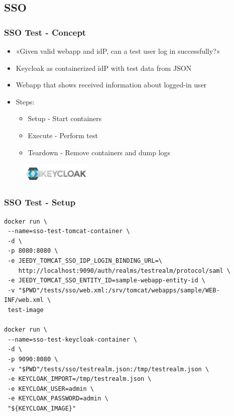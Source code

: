 \documentclass[14pt,aspectratio=169]{beamer}
\begin{document}
\subsection{SSO}

\begin{frame}
  \frametitle{SSO Test - Concept} 
  \begin{itemize}
    \item «Given valid webapp and idP, can a test user log in successfully?»
    \item Keycloak as containerized idP with test data from JSON
    \item Webapp that shows received information about logged-in user
    \item Steps:
    \begin{itemize}
      \item Setup - Start containers
      \item Execute - Perform test
      \item Teardown - Remove containers and dump logs
    \end{itemize}
  \end{itemize}
  \begin{figure}
    \includegraphics[width=0.3\textwidth]{images/keycloak_logo.png}
  \end{figure}
\end{frame}

\begin{frame}[fragile]
  \frametitle{SSO Test - Setup}

  \begin{verbatim}
docker run \
 --name=sso-test-tomcat-container \
 -d \
 -p 8080:8080 \
 -e JEEDY_TOMCAT_SSO_IDP_LOGIN_BINDING_URL=\
    http://localhost:9090/auth/realms/testrealm/protocol/saml \
 -e JEEDY_TOMCAT_SSO_ENTITY_ID=sample-webapp-entity-id \
 -v "$PWD"/tests/sso/web.xml:/srv/tomcat/webapps/sample/WEB-INF/web.xml \
 test-image

docker run \
 --name=sso-test-keycloak-container \
 -d \
 -p 9090:8080 \
 -v "$PWD"/tests/sso/testrealm.json:/tmp/testrealm.json \
 -e KEYCLOAK_IMPORT=/tmp/testrealm.json \
 -e KEYCLOAK_USER=admin \
 -e KEYCLOAK_PASSWORD=admin \
 "${KEYCLOAK_IMAGE}"
  \end{verbatim}
\end{frame}
\end{document}
